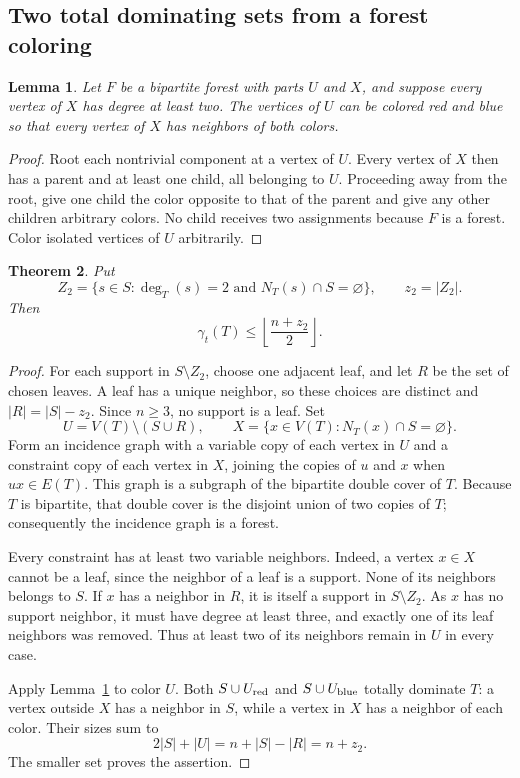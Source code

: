 \documentclass[11pt,a4paper]{article}
\newtheorem{theorem}{Theorem}[section]
\newtheorem{lemma}[theorem]{Lemma}
\theoremstyle{remark}
\begin{document}
\subsection{Two total dominating sets from a forest coloring}

\begin{lemma}\label{newtree:forest-coloring}
Let $F$ be a bipartite forest with parts $U$ and $X$, and suppose every
vertex of $X$ has degree at least two.  The vertices of $U$ can be colored
red and blue so that every vertex of $X$ has neighbors of both colors.
\end{lemma}
\begin{proof}
Root each nontrivial component at a vertex of $U$.  Every vertex of $X$
then has a parent and at least one child, all belonging to $U$.  Proceeding
away from the root, give one child the color opposite to that of the
parent and give any other children arbitrary colors.  No child receives
two assignments because $F$ is a forest.  Color isolated vertices of $U$
arbitrarily.
\end{proof}

\begin{theorem}\label{newtree:support-bound}
Put
\[
 Z_2=\{s\in S:\deg_T(s)=2\text{ and }N_T(s)\cap S=\varnothing\},
 \qquad z_2=|Z_2|.
\]
Then
\[
 \gamma_t(T)\leq \left\lfloor\frac{n+z_2}{2}\right\rfloor.
\]
\end{theorem}
\begin{proof}
For each support in $S\setminus Z_2$, choose one adjacent leaf, and let $R$
be the set of chosen leaves.  A leaf has a unique neighbor, so these
choices are distinct and $|R|=|S|-z_2$.  Since $n\geq3$, no support is a
leaf.  Set
\[
 U=V(T)\setminus(S\cup R),
 \qquad X=\{x\in V(T):N_T(x)\cap S=\varnothing\}.
\]
Form an incidence graph with a variable copy of each vertex in $U$ and a
constraint copy of each vertex in $X$, joining the copies of $u$ and $x$
when $ux\in E(T)$.  This graph is a subgraph of the bipartite double cover
of $T$.  Because $T$ is bipartite, that double cover is the disjoint union
of two copies of $T$; consequently the incidence graph is a forest.

Every constraint has at least two variable neighbors.  Indeed, a vertex
$x\in X$ cannot be a leaf, since the neighbor of a leaf is a support.
None of its neighbors belongs to $S$.  If $x$ has a neighbor in $R$, it is
itself a support in $S\setminus Z_2$.  As $x$ has no support neighbor, it
must have degree at least three, and exactly one of its leaf neighbors
was removed.  Thus at least two of its neighbors remain in $U$ in every
case.

Apply Lemma~\ref{newtree:forest-coloring} to color $U$.  Both
$S\cup U_{\rm red}$ and $S\cup U_{\rm blue}$ totally dominate $T$: a
vertex outside $X$ has a neighbor in $S$, while a vertex in $X$ has a
neighbor of each color.  Their sizes sum to
\[
 2|S|+|U|=n+|S|-|R|=n+z_2.
\]
The smaller set proves the assertion.
\end{proof}
\end{document}
